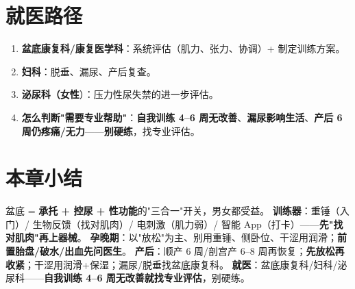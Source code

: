 \section{就医路径}
\begin{enumerate}[leftmargin=2em,itemsep=0.3em]
  \item \textbf{盆底康复科/康复医学科}：系统评估（肌力、张力、协调）+ 制定训练方案。
  \item \textbf{妇科}：脱垂、漏尿、产后复查。
  \item \textbf{泌尿科（女性}）：压力性尿失禁的进一步评估。
  \item \textbf{怎么判断"需要专业帮助"}：\textbf{自我训练 4--6 周无改善}、\textbf{漏尿影响生活}、\textbf{产后 6 周仍疼痛/无力}——\textbf{别硬练}，找专业评估。
\end{enumerate}

\section{本章小结}
盆底 = \textbf{承托 + 控尿 + 性功能}的"三合一"开关，男女都受益。
\textbf{训练器}：重锤（入门）/ 生物反馈（找对肌肉）/ 电刺激（肌力弱）/ 智能 App（打卡）——\textbf{先"找对肌肉"再上器械}。
\textbf{孕晚期}：以"放松"为主、别用重锤、侧卧位、干涩用润滑；\textbf{前置胎盘/破水/出血先问医生}。
\textbf{产后}：顺产 6 周/剖宫产 6--8 周再恢复；\textbf{先放松再收紧}；干涩用润滑+保湿；漏尿/脱垂找盆底康复科。
\textbf{就医}：盆底康复科/妇科/泌尿科——\textbf{自我训练 4--6 周无改善就找专业评估}，别硬练。
